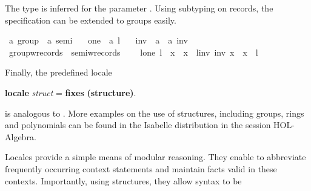 \begin{isabellebody}
\begin{isamarkuptext}%
The type  is inferred for the parameter .  Using subtyping on records, the specification can be extended
  to groups easily.%
\end{isamarkuptext}%
\isamarkuptrue%
\isamarkupfalse%
\ {\isacharprime}a\ group\ {\isacharequal}\ {\isachardoublequoteopen}{\isacharprime}a\ semi{\isachardoublequoteclose}\ {\isacharplus}\isanewline
\ \ one\ {\isacharcolon}{\isacharcolon}\ {\isachardoublequoteopen}{\isacharprime}a{\isachardoublequoteclose}\ {\isacharparenleft}{\isachardoublequoteopen}l{\isasymindex}{\isachardoublequoteclose}\ {}{}{}{\isacharparenright}\isanewline
\ \ inv\ {\isacharcolon}{\isacharcolon}\ {\isachardoublequoteopen}{\isacharprime}a\ {\isasymRightarrow}\ {\isacharprime}a{\isachardoublequoteclose}\ {\isacharparenleft}{\isachardoublequoteopen}inv{\isasymindex}\ {\isacharunderscore}{\isachardoublequoteclose}\ {\isacharbrackleft}{}{}{\isacharbrackright}\ {}{}{\isacharparenright}\isanewline
{}\isamarkupfalse%
\ group{\isacharunderscore}w{\isacharunderscore}records\ {\isacharequal}\ semi{\isacharunderscore}w{\isacharunderscore}records\ {\isacharplus}\isanewline
\ \ \ l{\isacharunderscore}one{\isacharcolon}\ {\isachardoublequoteopen}l\ {\isasymbullet}\ x\ {\isacharequal}\ x{\isachardoublequoteclose}\ \ l{\isacharunderscore}inv{\isacharcolon}\ {\isachardoublequoteopen}inv\ x\ {\isasymbullet}\ x\ {\isacharequal}\ l{\isachardoublequoteclose}%
\begin{isamarkuptext}%
Finally, the predefined locale
\begin{center}
  \textbf{locale} \textit{struct} = \textbf{fixes} 
    \textbf{(structure)}.
\end{center}
  is analogous to .  
  More examples on the use of structures, including groups, rings and
  polynomials can be found in the Isabelle distribution in the
  session HOL-Algebra.%
\end{isamarkuptext}%
\isamarkuptrue%
%
\isamarkuptrue%
%
\begin{isamarkuptext}%
Locales provide a simple means of modular reasoning.  They enable to
  abbreviate frequently occurring context statements and maintain facts
  valid in these contexts.  Importantly, using structures, they allow syntax to be

\end{isamarkuptext}
\end{isabellebody}
